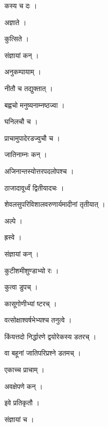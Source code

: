 \documentclass[10pt, openany]{book}
\begin{document}
\noindent कस्य च दः ।

\noindent अज्ञाते ।

\noindent कुत्सिते ।

\noindent संज्ञायां कन् ।

\noindent अनुकम्पायाम् ।

\noindent नीतौ च तद्युक्तात् ।

\noindent बह्वचो मनुष्यनाम्नष्ठज्वा ।

\noindent घनिलचौ च ।

\noindent प्राचामुपादेरडज्वुचौ च ।

\noindent जातिनाम्नः कन् ।

\noindent अजिनान्तस्योत्तरपदलोपश्च ।

\noindent ठाजादावूर्ध्वं द्वितीयादचः ।

\noindent शेवलसुपरिविशालवरुणार्यमादीनां तृतीयात् ।

\noindent अल्पे ।

\noindent ह्रस्वे ।

\noindent संज्ञायां कन् ।

\noindent कुटीशमीशुण्डाभ्यो रः ।

\noindent कुत्वा डुपच् ।

\noindent कासूगोणीभ्यां ष्टरच् ।

\noindent वत्सोक्षाश्वर्षभेभ्यश्च तनुत्वे ।

\noindent किंयत्तदो निर्द्धारणे द्वयोरेकस्य डतरच् ।

\noindent वा बहूनां जातिपरिप्रश्ने डतमच् ।

\noindent एकाच्च प्राचाम् ।

\noindent अवक्षेपणे कन् ।

\noindent इवे प्रतिकृतौ ।

\noindent संज्ञायां च ।
\end{document}
